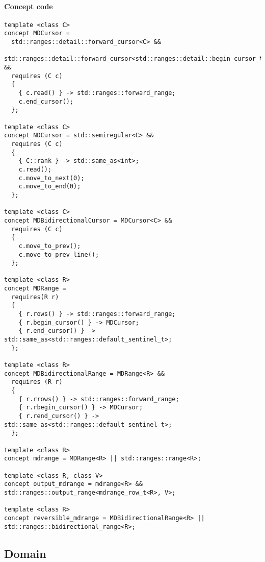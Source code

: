 \paragraph{Concept code}

\begin{verbatim}
template <class C>
concept MDCursor =
  std::ranges::detail::forward_cursor<C> &&
  std::ranges::detail::forward_cursor<std::ranges::detail::begin_cursor_t<C>> &&
  requires (C c)
  {
    { c.read() } -> std::ranges::forward_range;
    c.end_cursor();
  };

template <class C>
concept NDCursor = std::semiregular<C> &&
  requires (C c)
  {
    { C::rank } -> std::same_as<int>;
    c.read();
    c.move_to_next(0);
    c.move_to_end(0);
  };

template <class C>
concept MDBidirectionalCursor = MDCursor<C> &&
  requires (C c)
  {
    c.move_to_prev();
    c.move_to_prev_line();
  };

template <class R>
concept MDRange =
  requires(R r)
  {
    { r.rows() } -> std::ranges::forward_range;
    { r.begin_cursor() } -> MDCursor;
    { r.end_cursor() } -> std::same_as<std::ranges::default_sentinel_t>;
  };

template <class R>
concept MDBidirectionalRange = MDRange<R> &&
  requires (R r)
  {
    { r.rrows() } -> std::ranges::forward_range;
    { r.rbegin_cursor() } -> MDCursor;
    { r.rend_cursor() } -> std::same_as<std::ranges::default_sentinel_t>;
  };

template <class R>
concept mdrange = MDRange<R> || std::ranges::range<R>;

template <class R, class V>
concept output_mdrange = mdrange<R> && std::ranges::output_range<mdrange_row_t<R>, V>;

template <class R>
concept reversible_mdrange = MDBidirectionalRange<R> || std::ranges::bidirectional_range<R>;
\end{verbatim}




\clearpage

\subsection{Domain}

